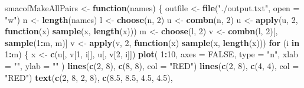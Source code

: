 \documentclass[
  12pt,
]{article}
\newenvironment{Shaded}{\begin{snugshade}}{\end{snugshade}}
\newcommand{\AttributeTok}[1]{\textcolor[rgb]{0.13,0.29,0.53}{#1}}
\newcommand{\ConstantTok}[1]{\textcolor[rgb]{0.56,0.35,0.01}{#1}}
\newcommand{\ControlFlowTok}[1]{\textcolor[rgb]{0.13,0.29,0.53}{\textbf{#1}}}
\newcommand{\DecValTok}[1]{\textcolor[rgb]{0.00,0.00,0.81}{#1}}
\newcommand{\FloatTok}[1]{\textcolor[rgb]{0.00,0.00,0.81}{#1}}
\newcommand{\FunctionTok}[1]{\textcolor[rgb]{0.13,0.29,0.53}{\textbf{#1}}}
\newcommand{\NormalTok}[1]{#1}
\newcommand{\OtherTok}[1]{\textcolor[rgb]{0.56,0.35,0.01}{#1}}
\newcommand{\SpecialCharTok}[1]{\textcolor[rgb]{0.81,0.36,0.00}{\textbf{#1}}}
\newcommand{\StringTok}[1]{\textcolor[rgb]{0.31,0.60,0.02}{#1}}
\begin{document}
\begin{Shaded}
\begin{Highlighting}[]
\NormalTok{smacofMakeAllPairs }\OtherTok{\textless{}{-}} \ControlFlowTok{function}\NormalTok{(names) \{}
\NormalTok{  outfile }\OtherTok{\textless{}{-}} \FunctionTok{file}\NormalTok{(}\StringTok{"./output.txt"}\NormalTok{, }\AttributeTok{open =} \StringTok{"w"}\NormalTok{)}
\NormalTok{  n }\OtherTok{\textless{}{-}} \FunctionTok{length}\NormalTok{(names)}
\NormalTok{  l }\OtherTok{\textless{}{-}} \FunctionTok{choose}\NormalTok{(n, }\DecValTok{2}\NormalTok{)}
\NormalTok{  u }\OtherTok{\textless{}{-}} \FunctionTok{combn}\NormalTok{(n, }\DecValTok{2}\NormalTok{)}
\NormalTok{  u }\OtherTok{\textless{}{-}} \FunctionTok{apply}\NormalTok{(u, }\DecValTok{2}\NormalTok{, }\ControlFlowTok{function}\NormalTok{(x)}
    \FunctionTok{sample}\NormalTok{(x, }\FunctionTok{length}\NormalTok{(x)))}
\NormalTok{  m }\OtherTok{\textless{}{-}} \FunctionTok{choose}\NormalTok{(l, }\DecValTok{2}\NormalTok{)}
\NormalTok{  v }\OtherTok{\textless{}{-}} \FunctionTok{combn}\NormalTok{(l, }\DecValTok{2}\NormalTok{)[, }\FunctionTok{sample}\NormalTok{(}\DecValTok{1}\SpecialCharTok{:}\NormalTok{m, m)]}
\NormalTok{  v }\OtherTok{\textless{}{-}} \FunctionTok{apply}\NormalTok{(v, }\DecValTok{2}\NormalTok{, }\ControlFlowTok{function}\NormalTok{(x)}
    \FunctionTok{sample}\NormalTok{(x, }\FunctionTok{length}\NormalTok{(x)))}
  \ControlFlowTok{for}\NormalTok{ (i }\ControlFlowTok{in} \DecValTok{1}\SpecialCharTok{:}\NormalTok{m) \{}
\NormalTok{    x }\OtherTok{\textless{}{-}} \FunctionTok{c}\NormalTok{(u[, v[}\DecValTok{1}\NormalTok{, i]], u[, v[}\DecValTok{2}\NormalTok{, i]])}
    \FunctionTok{plot}\NormalTok{(}
      \DecValTok{1}\SpecialCharTok{:}\DecValTok{10}\NormalTok{,}
      \AttributeTok{axes =} \ConstantTok{FALSE}\NormalTok{,}
      \AttributeTok{type =} \StringTok{"n"}\NormalTok{,}
      \AttributeTok{xlab =} \StringTok{""}\NormalTok{,}
      \AttributeTok{ylab =} \StringTok{""}
\NormalTok{    )}
    \FunctionTok{lines}\NormalTok{(}\FunctionTok{c}\NormalTok{(}\DecValTok{2}\NormalTok{, }\DecValTok{8}\NormalTok{), }\FunctionTok{c}\NormalTok{(}\DecValTok{8}\NormalTok{, }\DecValTok{8}\NormalTok{), }\AttributeTok{col =} \StringTok{"RED"}\NormalTok{)}
    \FunctionTok{lines}\NormalTok{(}\FunctionTok{c}\NormalTok{(}\DecValTok{2}\NormalTok{, }\DecValTok{8}\NormalTok{), }\FunctionTok{c}\NormalTok{(}\DecValTok{4}\NormalTok{, }\DecValTok{4}\NormalTok{), }\AttributeTok{col =} \StringTok{"RED"}\NormalTok{)}
    \FunctionTok{text}\NormalTok{(}\FunctionTok{c}\NormalTok{(}\DecValTok{2}\NormalTok{, }\DecValTok{8}\NormalTok{, }\DecValTok{2}\NormalTok{, }\DecValTok{8}\NormalTok{),}
         \FunctionTok{c}\NormalTok{(}\FloatTok{8.5}\NormalTok{, }\FloatTok{8.5}\NormalTok{, }\FloatTok{4.5}\NormalTok{, }\FloatTok{4.5}\NormalTok{),}

\end{Highlighting}
\end{Shaded}
\end{document}
